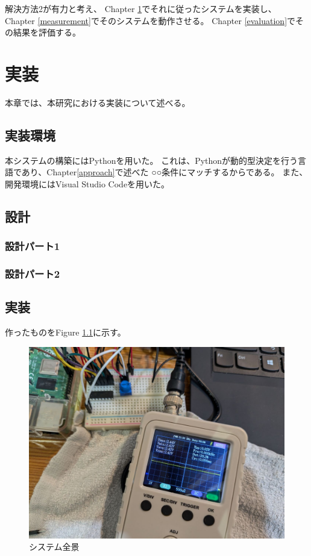 \documentclass[senior,final,11pt]{iputde-thesis}
\begin{document}
解決方法2が有力と考え、
Chapter \ref{implementation}でそれに従ったシステムを実装し、
Chapter \ref{measurement}でそのシステムを動作させる。
Chapter \ref{evaluation}でその結果を評価する。


\chapter{実装}\label{implementation}
本章では、本研究における実装について述べる。

\section{実装環境}

本システムの構築にはPythonを用いた。
これは、Pythonが動的型決定を行う言語であり、Chapter\ref{approach}で述べた
○○条件にマッチするからである。
また、開発環境にはVisual Studio Codeを用いた。

\section{設計}

\subsection{設計パート1}

\subsection{設計パート2}

\section{実装}

作ったものをFigure \ref{fig:system}に示す。

\begin{figure}[htb]
    \centering
    \includegraphics[width=\linewidth]{PXL_20241027_152756193_30.jpg}
    \caption{システム全景}
    \label{fig:system}
\end{figure}
\end{document}
